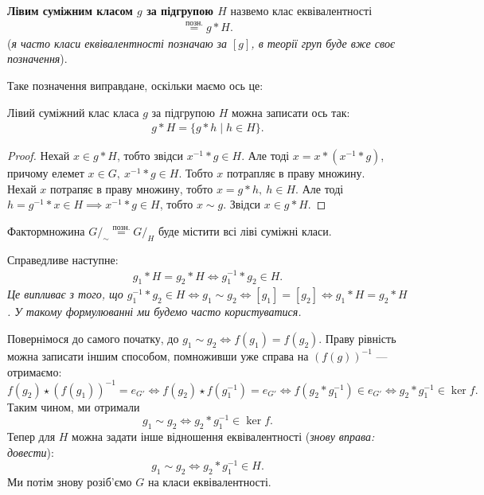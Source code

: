 \documentclass{math_library}
\begin{document}
\begin{definition}
\textbf{Лівим суміжним класом $g$ за підгрупою $H$} назвемо клас еквівалентності
\begin{align*}
[g] \overset{\text{позн.}}{=} g*H.
\end{align*}
(\textit{я часто класи еквівалентності позначаю за $[g]$, в теорії груп буде вже своє позначення}).
\end{definition}

Таке позначення виправдане, оскільки маємо ось це:

\begin{proposition}
Лівий суміжний клас класа $g$ за підгрупою $H$ можна записати ось так:
\begin{align*}
g*H = \{ g*h \mid h \in H \}.
\end{align*}
\end{proposition}

\begin{proof}
Нехай $x \in g*H$, тобто звідси $x^{-1}*g \in H$. Але тоді $x = x*(x^{-1}*g)$, причому елемет $x \in G,\ x^{-1}*g \in H$. Тобто $x$ потрапляє в праву множину.\\
Нехай $x$ потрапяє в праву множину, тобто $x = g*h,\ h \in H$. Але тоді $h = g^{-1}*x \in H \implies x^{-1}*g \in H$, тобто $x \sim g$. Звідси $x \in g*H$.
\end{proof}

Фактормножина $G/_{\sim} \overset{\text{позн.}}{=} G/_H$ буде містити всі ліві суміжні класи.

\begin{proposition}
Справедливе наступне:
\begin{align*}
g_1 * H = g_2 * H \iff g_1^{-1}*g_2 \in H.
\end{align*}
\textit{Це випливає з того, що $g_1^{-1}*g_2 \in H \iff g_1 \sim g_2 \iff [g_1] = [g_2] \iff g_1*H = g_2*H$. У такому формулюванні ми будемо часто користуватися.}
\end{proposition}

Повернімося до самого початку, до $g_1 \sim g_2 \iff f(g_1) = f(g_2)$. Праву рівність можна записати іншим способом, помноживши уже справа на $(f(g))^{-1}$ --- отримаємо:
\[
f(g_2) \star (f(g_1))^{-1} = e_{G'} \iff f(g_2) \star f(g_1^{-1}) = e_{G'} \iff f(g_2*g_1^{-1}) \in e_{G'} \iff g_2*g_1^{-1} \in \ker f.\]
Таким чином, ми отримали 
\[
g_1 \sim g_2 \iff g_2*g_1^{-1} \in \ker f.
\]
Тепер для $H$ можна задати інше відношення еквівалентності (\textit{знову вправа: довести}):
\[
g_1 \sim g_2 \iff g_2*g_1^{-1} \in H.
\]
Ми потім знову розіб'ємо $G$ на класи еквівалентності.
\end{document}
